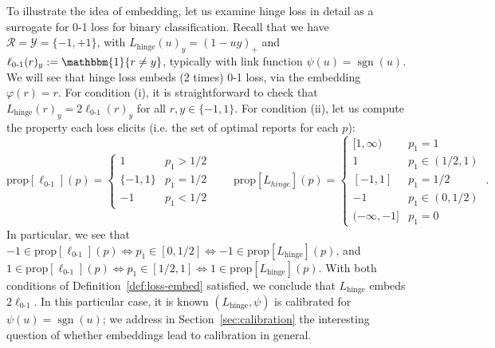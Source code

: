 \documentclass[12pt]{article}
\newcommand{\prop}[1]{\mathrm{prop}[#1]}
\newcommand{\simplex}{\Delta_\Y}
\newcommand{\R}{\mathcal{R}}
\newcommand{\Y}{\mathcal{Y}}
\newcommand{\inprod}[2]{\langle #1, #2 \rangle}%
\newcommand{\ones}{\mathbbm{1}}
\newcommand{\Ind}[1]{\ones\{#1\}}
\newcommand{\hinge}{L_{\mathrm{hinge}}}
\newcommand{\ellzo}{\ell_{\text{0-1}}}
\DeclareMathOperator*{\sgn}{sgn}
\begin{document}
To illustrate the idea of embedding, let us examine hinge loss in detail as a surrogate for 0-1 loss for binary classification.
Recall that we have $\R = \Y = \{-1, +1\}$, with $\hinge(u)_y = (1 - uy)_+$ and $\ellzo(r)_y := \Ind{r\neq y}$, typically with link function $\psi(u) = \sgn(u)$.
We will see that hinge loss embeds (2 times) 0-1 loss, via the embedding $\varphi(r) = r$.
For condition (i), it is straightforward to check that $\hinge(r)_y = 2\ellzo(r)_y$ for all $r,y\in\{-1,1\}$.
For condition (ii), let us compute the property each loss elicits (i.e. the set of optimal reports for each $p$):
\[
\prop{\ellzo}(p) = \begin{cases}
1 & p_1 > 1/2 \\
\{-1,1\} & p_1 = 1/2\\
-1 & p_1 < 1/2
\end{cases}
\qquad 
\prop{L_{hinge}}(p) = \begin{cases}
[1,\infty) & p_1 = 1\\
1 & p_1 \in (1/2,1) \\
[-1,1] & p_1 = 1/2\\
-1& p_1 \in (0, 1/2)\\
(-\infty, -1]& p_1 = 0
\end{cases}~.
\]
In particular, we see that $-1 \in \prop{\ellzo}(p) \iff p_1 \in [0, 1/2] \iff -1 \in \prop{\hinge}(p)$, and $1 \in \prop{\ellzo}(p) \iff p_1 \in [1/2,1] \iff 1 \in \prop{\hinge}(p)$.
With both conditions of Definition~\ref{def:loss-embed} satisfied, we conclude that $\hinge$ embeds $2\ellzo$.
In this particular case, it is known $(\hinge,\psi)$ is calibrated for $\psi(u) = \sgn(u)$; we address in Section~\ref{sec:calibration} the interesting question of whether embeddings lead to calibration in general.

\end{document}
